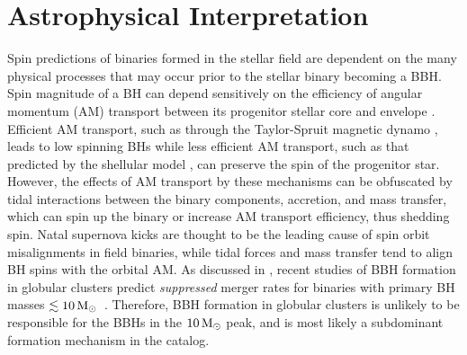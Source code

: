 \section{Astrophysical Interpretation} \label{sec:astro}


Spin predictions of binaries formed in the stellar field are dependent on the many physical processes that may occur prior to the stellar binary becoming a BBH.  Spin magnitude of a BH can depend sensitively on the efficiency of angular momentum (AM) transport between its progenitor stellar core and envelope \citep{2203.02515}. Efficient AM transport, such as through the Taylor-Spruit magnetic dynamo \citep{10.1051/0004-6361:20011465}, leads to low spinning BHs \citep{10.3847/2041-8213/ab339b} while less efficient AM transport, such as that predicted by the shellular model \citep{1992A&A...265..115Z,2012A&A...537A.146E,10.3847/1538-4365/aacb24,2019MNRAS.485.4641C}, can preserve the spin of the progenitor star. However, the effects of AM transport by these mechanisms can be obfuscated by tidal interactions between the binary components, accretion, and mass transfer, which can spin up the binary or increase AM transport efficiency, thus shedding spin. Natal supernova kicks are thought to be the leading cause of spin orbit misalignments in field binaries, while tidal forces and mass transfer tend to align BH spins with the orbital AM. As discussed in \citet{2023PhRvX..13a1048A}, recent studies of BBH formation in globular clusters predict \emph{suppressed} merger rates for binaries with primary BH masses $\lesssim 10 {\,\rm M}_\odot$~\citep{2009.01861,10.1103/PhysRevD.100.043027,1808.04514}.  Therefore, BBH formation in globular clusters is unlikely to be responsible for the BBHs in the $10{\,\rm M}_\odot$ peak, and is most likely a subdominant formation mechanism in the catalog.


